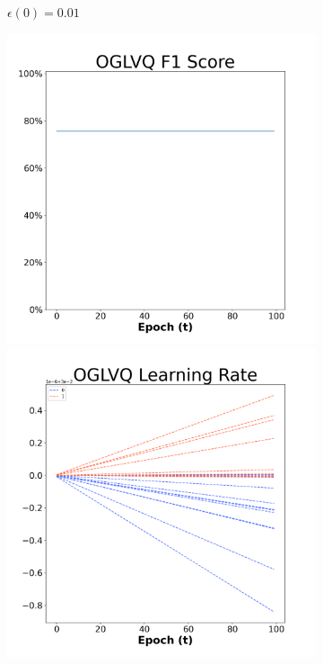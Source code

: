 \begin{figure}[H]
\begin{subfigure}{0.3\textwidth}
\caption{$\epsilon(0)=0.01$}
\end{subfigure}\hfil %
\begin{subfigure}{0.3\textwidth}
\includegraphics[width=\linewidth]{images/exper2/NSP/OGLVQ_0.03_f1.png}
\includegraphics[width=\linewidth]{images/exper2/NSP/OGLVQ_0.03_lr.png}

\end{subfigure}
\end{figure}
